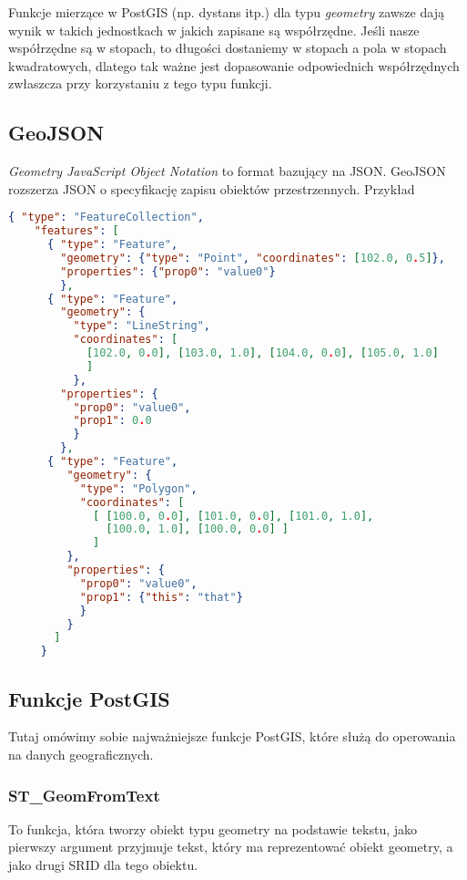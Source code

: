 \documentclass[a4paper,15pt]{article}
\newcommand{\issue}[2]{
    \begin{tcolorbox}[colback=issueColor!5!white,colframe=issueColor,title={Pamiętaj #1}]
        #2
    \end{tcolorbox}
}
\begin{document}
\issue{}{
Funkcje mierzące w PostGIS (np. dystans itp.) dla typu \textit{geometry} zawsze dają wynik w takich jednostkach w jakich zapisane są współrzędne. Jeśli nasze współrzędne są w stopach, to długości dostaniemy w stopach a pola w stopach kwadratowych, dlatego tak ważne jest dopasowanie odpowiednich współrzędnych zwłaszcza przy korzystaniu z tego typu funkcji. 
}


\newpage
\subsection{GeoJSON}
\textit{Geometry JavaScript Object Notation} to format bazujący na JSON. GeoJSON rozszerza JSON o specyfikację zapisu obiektów przestrzennych. Przykład

\begin{lstlisting}[language=json,firstnumber=1]
{ "type": "FeatureCollection",
    "features": [
      { "type": "Feature",
        "geometry": {"type": "Point", "coordinates": [102.0, 0.5]},
        "properties": {"prop0": "value0"}
        },
      { "type": "Feature",
        "geometry": {
          "type": "LineString",
          "coordinates": [
            [102.0, 0.0], [103.0, 1.0], [104.0, 0.0], [105.0, 1.0]
            ]
          },
        "properties": {
          "prop0": "value0",
          "prop1": 0.0
          }
        },
      { "type": "Feature",
         "geometry": {
           "type": "Polygon",
           "coordinates": [
             [ [100.0, 0.0], [101.0, 0.0], [101.0, 1.0],
               [100.0, 1.0], [100.0, 0.0] ]
             ]
         },
         "properties": {
           "prop0": "value0",
           "prop1": {"this": "that"}
           }
         }
       ]
     }
\end{lstlisting}



\newpage
\subsection{Funkcje PostGIS}
Tutaj omówimy sobie najważniejsze funkcje PostGIS, które służą do operowania na danych geograficznych.

\subsubsection{ST\_GeomFromText}
To funkcja, która tworzy obiekt typu geometry na podstawie tekstu, jako pierwszy argument przyjmuje tekst, który ma reprezentować obiekt geometry, a jako drugi SRID dla tego obiektu. 
\end{document}
